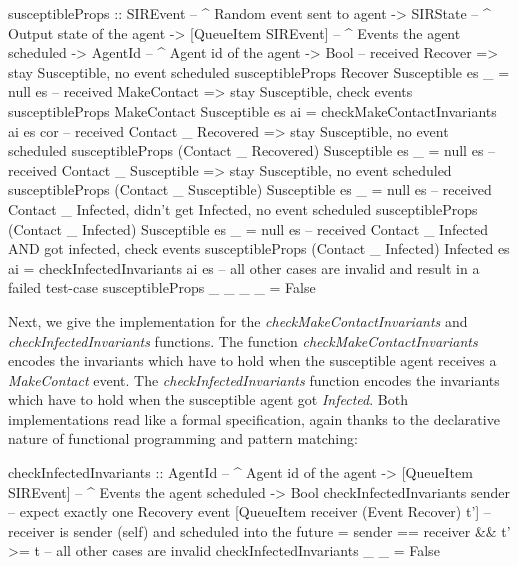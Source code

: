 \begin{HaskellCode}
susceptibleProps :: SIREvent              -- ^ Random event sent to agent
                 -> SIRState              -- ^ Output state of the agent
                 -> [QueueItem SIREvent]  -- ^ Events the agent scheduled
                 -> AgentId               -- ^ Agent id of the agent
                 -> Bool
-- received Recover => stay Susceptible, no event scheduled
susceptibleProps Recover Susceptible es _ = null es
-- received MakeContact => stay Susceptible, check events
susceptibleProps MakeContact Susceptible es ai
  = checkMakeContactInvariants ai es cor 
-- received Contact _ Recovered => stay Susceptible, no event scheduled
susceptibleProps (Contact _ Recovered) Susceptible es _ = null es
-- received Contact _ Susceptible => stay Susceptible, no event scheduled
susceptibleProps (Contact _ Susceptible) Susceptible es _  = null es
-- received Contact _ Infected, didn't get Infected, no event scheduled
susceptibleProps (Contact _ Infected) Susceptible es _ = null es
-- received Contact _ Infected AND got infected, check events
susceptibleProps (Contact _ Infected) Infected es ai
  = checkInfectedInvariants ai es
-- all other cases are invalid and result in a failed test-case
susceptibleProps _ _ _ _ = False
\end{HaskellCode}

Next, we give the implementation for the \textit{checkMakeContactInvariants} and \textit{checkInfectedInvariants} functions. The function \textit{checkMakeContactInvariants} encodes the invariants which have to hold when the susceptible agent receives a \textit{MakeContact} event. The \textit{checkInfectedInvariants} function encodes the invariants which have to hold when the susceptible agent got \textit{Infected}. Both implementations read like a formal specification, again thanks to the declarative nature of functional programming and pattern matching:

\begin{HaskellCode}
checkInfectedInvariants :: AgentId              -- ^ Agent id of the agent 
                        -> [QueueItem SIREvent] -- ^ Events the agent scheduled
                        -> Bool
checkInfectedInvariants sender 
  -- expect exactly one Recovery event
  [QueueItem receiver (Event Recover) t'] 
  -- receiver is sender (self) and scheduled into the future
  = sender == receiver && t' >= t 
-- all other cases are invalid
checkInfectedInvariants _ _ = False
\end{HaskellCode}

